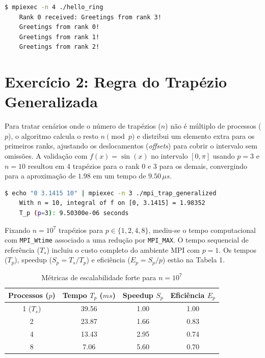 \documentclass[a4paper, 12pt]{article}
\begin{document}
\begin{lstlisting}[language=bash, caption=Exemplo de execução do programa em anel, basicstyle=\ttfamily\footnotesize]
    $ mpiexec -n 4 ./hello_ring
    Rank 0 received: Greetings from rank 3!
    Greetings from rank 0!
    Greetings from rank 1!
    Greetings from rank 2!
\end{lstlisting}

\section{Exercício 2: Regra do Trapézio Generalizada}

Para tratar cenários onde o número de trapézios ($n$) não é múltiplo de processos ($p$), o algoritmo calcula o resto $n \pmod p$ e distribui um elemento extra para os primeiros ranks, ajustando os deslocamentos (\textit{offsets}) para cobrir o intervalo sem omissões. A validação com $f(x) = \sin(x)$ no intervalo $[0, \pi]$ usando $p = 3$ e $n = 10$ resultou em 4 trapézios para o rank 0 e 3 para os demais, convergindo para a aproximação de $1.98$ em um tempo de $9.50\,\mu s$.

\begin{lstlisting}[language=bash, caption={Validação com p = 3 e n = 10}, basicstyle=\ttfamily\footnotesize]
    $ echo "0 3.1415 10" | mpiexec -n 3 ./mpi_trap_generalized
    With n = 10, integral of f on [0, 3.1415] = 1.98352
    T_p (p=3): 9.50300e-06 seconds
\end{lstlisting}

Fixando $n = 10^7$ trapézios para $p \in \{1, 2, 4, 8\}$, mediu-se o tempo computacional com \verb|MPI_Wtime| associado a uma redução por \verb|MPI_MAX|. O tempo sequencial de referência ($T_s$) incluiu o custo completo do ambiente MPI com $p=1$. Os tempos ($T_p$), speedup ($S_p = T_s/T_p$) e eficiência ($E_p = S_p/p$) estão na Tabela 1.

\begin{table}[H]
\centering
\caption{Métricas de escalabilidade forte para $n = 10^7$}
\begin{tabular}{cccc}
\hline
Processos ($p$) & Tempo $T_p$ ($ms$) & Speedup $S_p$ & Eficiência $E_p$ \\ \hline
1 ($T_s$)       & 39.56              & 1.00          & 1.00             \\
2               & 23.87              & 1.66          & 0.83             \\
4               & 13.43              & 2.95          & 0.74             \\
8               & 7.06               & 5.60          & 0.70             \\ \hline
\end{tabular}
\end{table}
\end{document}
